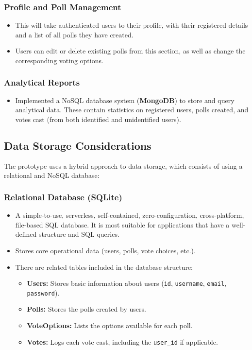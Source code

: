 \subsubsection{Profile and Poll Management}
\begin{itemize}
    \item This will take authenticated users to their profile, with their registered details and a list of all polls they have created.
    \item Users can edit or delete existing polls from this section, as well as change the corresponding voting options.
\end{itemize}

\subsubsection{Analytical Reports}
\begin{itemize}
    \item Implemented a NoSQL database system (\textbf{MongoDB}) to store and query analytical data. These contain statistics on registered users, polls created, and votes cast (from both identified and unidentified users).
\end{itemize}

\subsection{Data Storage Considerations}

The prototype uses a hybrid approach to data storage, which consists of using a relational and NoSQL database:


\subsubsection{Relational Database (SQLite)}

\begin{itemize}
    \item A simple-to-use, serverless, self-contained, zero-configuration, cross-platform, file-based SQL database. It is most suitable for applications that have a well-defined structure and SQL queries.
    \item Stores core operational data (users, polls, vote choices, etc.).
    \item There are related tables included in the database structure:
    \begin{itemize}
        \item \textbf{Users:} Stores basic information about users (\texttt{id}, \texttt{username}, \texttt{email}, \texttt{password}).
        \item \textbf{Polls:} Stores the polls created by users.
        \item \textbf{VoteOptions:} Lists the options available for each poll.
        \item \textbf{Votes:} Logs each vote cast, including the \texttt{user\_id} if applicable.
    \end{itemize}
\end{itemize}


